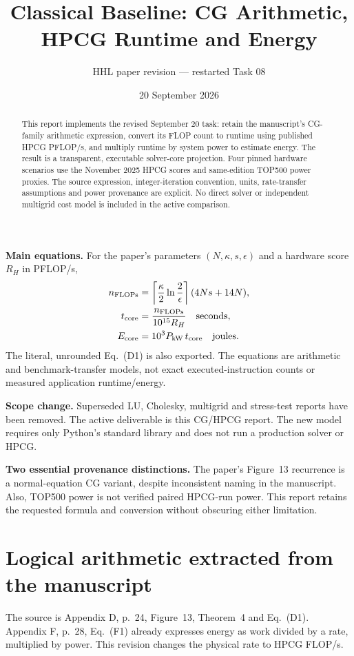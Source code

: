 \documentclass[11pt,a4paper]{article}
\title{Classical Baseline: CG Arithmetic,\\HPCG Runtime and Energy}
\author{HHL paper revision --- restarted Task 08}
\date{20 September 2026}
\begin{document}
\maketitle
\begin{abstract}
This report implements the revised September 20 task: retain the manuscript's CG-family arithmetic expression, convert its FLOP count to runtime using published HPCG PFLOP/s, and multiply runtime by system power to estimate energy. The result is a transparent, executable solver-core projection. Four pinned hardware scenarios use the November 2025 HPCG scores and same-edition TOP500 power proxies. The source expression, integer-iteration convention, units, rate-transfer assumptions and power provenance are explicit. No direct solver or independent multigrid cost model is included in the active comparison.
\end{abstract}
\textbf{Main equations.} For the paper's parameters $(N,\kappa,s,\epsilon)$ and a hardware score $R_H$ in PFLOP/s,
\begin{align}
 n_{\rm FLOPs}&=\left\lceil\frac{\kappa}{2}\ln\frac2\epsilon\right\rceil(4Ns+14N),\\
 t_{\rm core}&=\frac{n_{\rm FLOPs}}{10^{15}R_H}\quad\text{seconds},\\
 E_{\rm core}&=10^3P_{\rm kW}\,t_{\rm core}\quad\text{joules}.
\end{align}
The literal, unrounded Eq.~(D1) is also exported. The equations are arithmetic and benchmark-transfer models, not exact executed-instruction counts or measured application runtime/energy.

\textbf{Scope change.} Superseded LU, Cholesky, multigrid and stress-test reports have been removed. The active deliverable is this CG/HPCG report. The new model requires only Python's standard library and does not run a production solver or HPCG.

\textbf{Two essential provenance distinctions.} The paper's Figure~13 recurrence is a normal-equation CG variant, despite inconsistent naming in the manuscript. Also, TOP500 power is not verified paired HPCG-run power. This report retains the requested formula and conversion without obscuring either limitation.
\newpage

\section{Logical arithmetic extracted from the manuscript}
The source is Appendix D, p.~24, Figure~13, Theorem~4 and Eq.~(D1). Appendix F, p.~28, Eq.~(F1) already expresses energy as work divided by a rate, multiplied by power. This revision changes the physical rate to HPCG FLOP/s.
\end{document}
